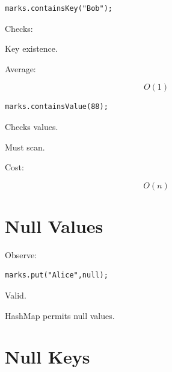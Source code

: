 \documentclass[11pt,a4paper]{book}
\begin{document}
\begin{verbatim} 
marks.containsKey("Bob");
\end{verbatim}


Checks:


Key existence.


Average:

\[
O(1)
\]



\begin{verbatim} 
marks.containsValue(88);
\end{verbatim}


Checks values.


Must scan.


Cost:

\[
O(n)
\]


\section{Null Values}

Observe:

\begin{verbatim} 
marks.put("Alice",null);
\end{verbatim}


Valid.


HashMap permits null values.


\section{Null Keys}
\end{document}
